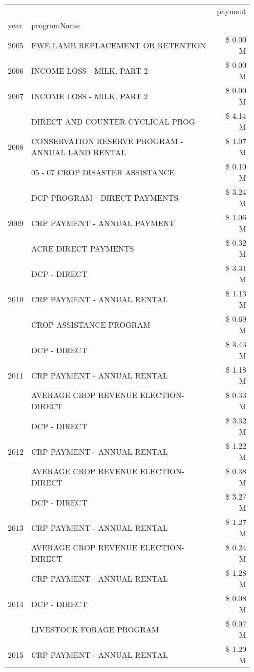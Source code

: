 \begin{tabular}{llr}
\toprule
 &  & payment \\
year & programName &  \\
\midrule
2005 & EWE LAMB REPLACEMENT OR RETENTION & \$ 0.00 M \\
\cline{1-3}
2006 & INCOME LOSS - MILK, PART 2 & \$ 0.00 M \\
\cline{1-3}
2007 & INCOME LOSS - MILK, PART 2 & \$ 0.00 M \\
\cline{1-3}
\multirow[t]{3}{*}{2008} & DIRECT AND COUNTER CYCLICAL PROG & \$ 4.14 M \\
 & CONSERVATION RESERVE PROGRAM - ANNUAL LAND RENTAL & \$ 1.07 M \\
 & 05 - 07 CROP DISASTER ASSISTANCE & \$ 0.10 M \\
\cline{1-3}
\multirow[t]{3}{*}{2009} & DCP PROGRAM - DIRECT PAYMENTS & \$ 3.24 M \\
 & CRP PAYMENT - ANNUAL PAYMENT & \$ 1.06 M \\
 & ACRE DIRECT PAYMENTS & \$ 0.32 M \\
\cline{1-3}
\multirow[t]{3}{*}{2010} & DCP - DIRECT & \$ 3.31 M \\
 & CRP PAYMENT - ANNUAL RENTAL & \$ 1.13 M \\
 & CROP ASSISTANCE PROGRAM & \$ 0.69 M \\
\cline{1-3}
\multirow[t]{3}{*}{2011} & DCP - DIRECT & \$ 3.43 M \\
 & CRP PAYMENT - ANNUAL RENTAL & \$ 1.18 M \\
 & AVERAGE CROP REVENUE ELECTION-DIRECT & \$ 0.33 M \\
\cline{1-3}
\multirow[t]{3}{*}{2012} & DCP - DIRECT & \$ 3.32 M \\
 & CRP PAYMENT - ANNUAL RENTAL & \$ 1.22 M \\
 & AVERAGE CROP REVENUE ELECTION-DIRECT & \$ 0.38 M \\
\cline{1-3}
\multirow[t]{3}{*}{2013} & DCP - DIRECT & \$ 3.27 M \\
 & CRP PAYMENT - ANNUAL RENTAL & \$ 1.27 M \\
 & AVERAGE CROP REVENUE ELECTION-DIRECT & \$ 0.24 M \\
\cline{1-3}
\multirow[t]{3}{*}{2014} & CRP PAYMENT - ANNUAL RENTAL & \$ 1.28 M \\
 & DCP - DIRECT & \$ 0.08 M \\
 & LIVESTOCK FORAGE PROGRAM & \$ 0.07 M \\
\cline{1-3}
\multirow[t]{2}{*}{2015} & CRP PAYMENT - ANNUAL RENTAL & \$ 1.29 M \\

\end{tabular}
